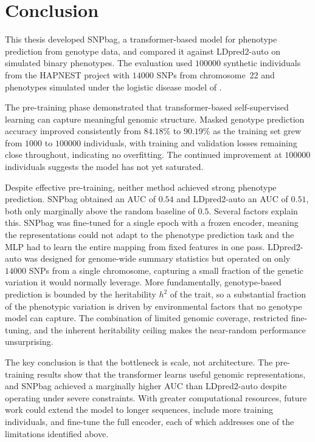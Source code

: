 \chapter{Conclusion}
\label{ch:conclusion}

This thesis developed SNPbag, a transformer-based model for phenotype
prediction from genotype data, and compared it against LDpred2-auto on
simulated binary phenotypes. The evaluation used $100000$ synthetic
individuals from the HAPNEST project with $14000$ SNPs from
chromosome~22 and phenotypes simulated under the logistic disease model
of \citet{Majumdar2018}.

The pre-training phase demonstrated that transformer-based self-supervised
learning can capture meaningful genomic structure. Masked genotype
prediction accuracy improved consistently from $84.18\%$ to $90.19\%$ as
the training set grew from $1000$ to $100000$ individuals, with
training and validation losses remaining close throughout, indicating no
overfitting. The continued improvement at $100000$ individuals suggests
the model has not yet saturated.

Despite effective pre-training, neither method achieved strong phenotype
prediction. SNPbag obtained an AUC of $0.54$ and LDpred2-auto an AUC of
$0.51$, both only marginally above the random baseline of $0.5$. Several
factors explain this. SNPbag was fine-tuned for a single epoch with a
frozen encoder, meaning the representations could not adapt to the
phenotype prediction task and the MLP had to learn the entire mapping from
fixed features in one pass. LDpred2-auto was designed for genome-wide
summary statistics but operated on only $14000$ SNPs from a single
chromosome, capturing a small fraction of the genetic variation it would
normally leverage. More fundamentally, genotype-based prediction is bounded
by the heritability $h^2$ of the trait, so a substantial fraction of the
phenotypic variation is driven by environmental factors that no genotype
model can capture. The combination of limited genomic coverage, restricted
fine-tuning, and the inherent heritability ceiling makes the near-random
performance unsurprising.

The key conclusion is that the bottleneck is scale, not architecture. The
pre-training results show that the transformer learns useful genomic
representations, and SNPbag achieved a marginally higher AUC than
LDpred2-auto despite operating under severe constraints. With greater
computational resources, future work could extend the model to longer
sequences, include more training individuals, and fine-tune the full
encoder, each of which addresses one of the limitations identified above.